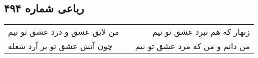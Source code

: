 \begin{center}
\section*{رباعی شماره ۴۹۴}
\label{sec:sh494}
\begin{longtable}{l p{0.5cm} r}
من لایق عشق و درد عشق تو نیم
&&
زنهار که هم نبرد عشق تو نیم
\\
چون آتش عشق تو بر آرد شعله
&&
من دانم و من که مرد عشق تو نیم
\\
\end{longtable}
\end{center}
